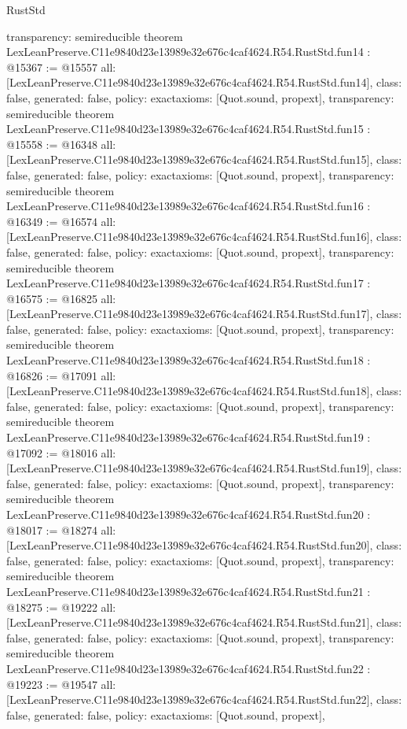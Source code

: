 \begin{lexlean}{RustStd}
\begin{coremodule}
{  transparency: semireducible
}
theorem LexLeanPreserve.C11e9840d23e13989e32e676c4caf4624.R54.RustStd.fun14 : @15367 := @15557 {
  all: [LexLeanPreserve.C11e9840d23e13989e32e676c4caf4624.R54.RustStd.fun14],
  class: false,
  generated: false,
  policy: exact{axioms: [Quot.sound, propext]},
  transparency: semireducible
}
theorem LexLeanPreserve.C11e9840d23e13989e32e676c4caf4624.R54.RustStd.fun15 : @15558 := @16348 {
  all: [LexLeanPreserve.C11e9840d23e13989e32e676c4caf4624.R54.RustStd.fun15],
  class: false,
  generated: false,
  policy: exact{axioms: [Quot.sound, propext]},
  transparency: semireducible
}
theorem LexLeanPreserve.C11e9840d23e13989e32e676c4caf4624.R54.RustStd.fun16 : @16349 := @16574 {
  all: [LexLeanPreserve.C11e9840d23e13989e32e676c4caf4624.R54.RustStd.fun16],
  class: false,
  generated: false,
  policy: exact{axioms: [Quot.sound, propext]},
  transparency: semireducible
}
theorem LexLeanPreserve.C11e9840d23e13989e32e676c4caf4624.R54.RustStd.fun17 : @16575 := @16825 {
  all: [LexLeanPreserve.C11e9840d23e13989e32e676c4caf4624.R54.RustStd.fun17],
  class: false,
  generated: false,
  policy: exact{axioms: [Quot.sound, propext]},
  transparency: semireducible
}
theorem LexLeanPreserve.C11e9840d23e13989e32e676c4caf4624.R54.RustStd.fun18 : @16826 := @17091 {
  all: [LexLeanPreserve.C11e9840d23e13989e32e676c4caf4624.R54.RustStd.fun18],
  class: false,
  generated: false,
  policy: exact{axioms: [Quot.sound, propext]},
  transparency: semireducible
}
theorem LexLeanPreserve.C11e9840d23e13989e32e676c4caf4624.R54.RustStd.fun19 : @17092 := @18016 {
  all: [LexLeanPreserve.C11e9840d23e13989e32e676c4caf4624.R54.RustStd.fun19],
  class: false,
  generated: false,
  policy: exact{axioms: [Quot.sound, propext]},
  transparency: semireducible
}
theorem LexLeanPreserve.C11e9840d23e13989e32e676c4caf4624.R54.RustStd.fun20 : @18017 := @18274 {
  all: [LexLeanPreserve.C11e9840d23e13989e32e676c4caf4624.R54.RustStd.fun20],
  class: false,
  generated: false,
  policy: exact{axioms: [Quot.sound, propext]},
  transparency: semireducible
}
theorem LexLeanPreserve.C11e9840d23e13989e32e676c4caf4624.R54.RustStd.fun21 : @18275 := @19222 {
  all: [LexLeanPreserve.C11e9840d23e13989e32e676c4caf4624.R54.RustStd.fun21],
  class: false,
  generated: false,
  policy: exact{axioms: [Quot.sound, propext]},
  transparency: semireducible
}
theorem LexLeanPreserve.C11e9840d23e13989e32e676c4caf4624.R54.RustStd.fun22 : @19223 := @19547 {
  all: [LexLeanPreserve.C11e9840d23e13989e32e676c4caf4624.R54.RustStd.fun22],
  class: false,
  generated: false,
  policy: exact{axioms: [Quot.sound, propext]},
}
\end{coremodule}
\end{lexlean}
